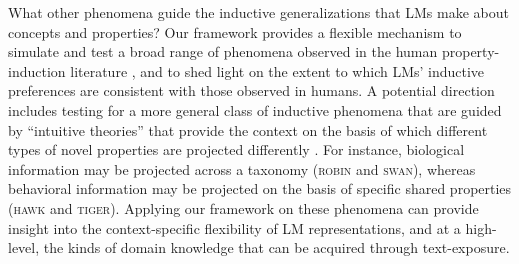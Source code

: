 \documentclass[10pt,letterpaper]{article}
\newcommand{\ake}[1]{\textcolor{blue}{$_{AE}$[#1]}}
\newcommand{\todo}[1]{\textcolor{purple}{$_{todo}$[#1]}}
\begin{document}
What other phenomena guide the inductive generalizations that LMs make about concepts and properties?
Our framework provides a flexible mechanism to simulate and test a broad range of phenomena observed in the human property-induction literature \citep[see][]{kemp2014taxonomy, hayes2018inductive}, and to shed light on the extent to which LMs' inductive preferences are consistent with those observed in humans. 
A potential direction includes testing for a more general class of inductive phenomena that are guided by ``intuitive theories'' \citep{murphy1993theories} that provide the context on the basis of which different types of novel properties are projected differently \citep{carey1985conceptual, kemp2009structured}. For instance, biological information may be projected across a taxonomy (\textsc{robin} and \textsc{swan}), whereas behavioral information may be projected on the basis of specific shared properties (\textsc{hawk} and \textsc{tiger}).
Applying our framework on these phenomena can provide insight into the context-specific flexibility of LM representations, and at a high-level, the kinds of domain knowledge that can be acquired through text-exposure.
\end{document}
